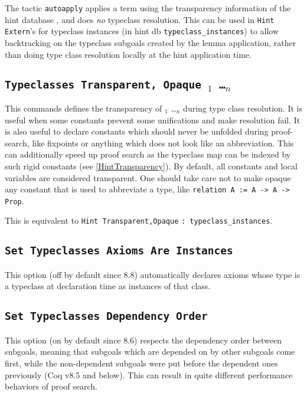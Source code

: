 
The tactic {\tt autoapply} applies a term using the transparency
information of the hint database {\ident}, and does \emph{no} typeclass
resolution. This can be used in {\tt Hint Extern}'s for typeclass
instances (in hint db {\tt typeclass\_instances}) to
allow backtracking on the typeclass subgoals created by the lemma
application, rather than doing type class resolution locally at the hint
application time.

\subsection{\tt Typeclasses Transparent, Opaque {\ident$_1$ \ldots \ident$_n$}}
\label{TypeclassesTransparency}

This commands defines the transparency of {\ident$_1$ \ldots \ident$_n$} 
during type class resolution. It is useful when some constants prevent some
unifications and make resolution fail. It is also useful to declare
constants which should never be unfolded during proof-search, like
fixpoints or anything which does not look like an abbreviation. This can
additionally speed up proof search as the typeclass map can be indexed
by such rigid constants (see \ref{HintTransparency}).
By default, all constants and local variables are considered transparent.
One should take care not to make opaque any constant that is used to
abbreviate a type, like {\tt relation A := A -> A -> Prop}.

This is equivalent to {\tt Hint Transparent,Opaque} {\ident} {\tt: typeclass\_instances}.

\subsection{\tt Set Typeclasses Axioms Are Instances}

This option (off by default since 8.8) automatically declares axioms
whose type is a typeclass at declaration time as instances of that
class.

\subsection{\tt Set Typeclasses Dependency Order}

This option (on by default since 8.6) respects the dependency order between
subgoals, meaning that subgoals which are depended on by other subgoals
come first, while the non-dependent subgoals were put before the
dependent ones previously (Coq v8.5 and below). This can result in quite
different performance behaviors of proof search.

